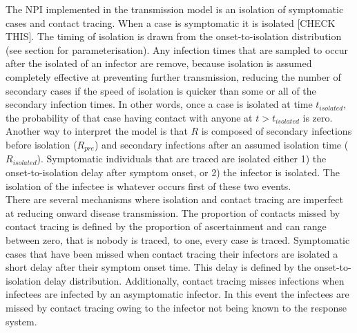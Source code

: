\documentclass{article}
\begin{document}
The NPI implemented in the transmission model is an isolation of symptomatic cases and contact tracing. When a case is symptomatic it is isolated [CHECK THIS]. The timing of isolation is drawn from the onset-to-isolation distribution (see  section for parameterisation). Any infection times that are sampled to occur after the isolated of an infector are remove, because isolation is assumed completely effective at preventing further transmission, reducing the number of secondary cases if the speed of isolation is quicker than some or all of the secondary infection times. In other words, once a case is isolated at time $t_{isolated}$, the probability of that case having contact with anyone at $t > t_{isolated}$ is zero. Another way to interpret the model is that $R$ is composed of secondary infections before isolation ($R_{pre}$) and secondary infections after an assumed isolation time ($R_{isolated}$). Symptomatic individuals that are traced are isolated either 1) the onset-to-isolation delay after symptom onset, or 2) the infector is isolated. The isolation of the infectee is whatever occurs first of these two events.  \\

There are several mechanisms where isolation and contact tracing are imperfect at reducing onward disease transmission. The proportion of contacts missed by contact tracing is defined by the proportion of ascertainment and can range between zero, that is nobody is traced, to one, every case is traced. Symptomatic cases that have been missed when contact tracing their infectors are isolated a short delay after their symptom onset time. This delay is defined by the onset-to-isolation delay distribution. Additionally, contact tracing misses infections when infectees are infected by an asymptomatic infector. In this event the infectees are missed by contact tracing owing to the infector not being known to the response system. \\
\end{document}
